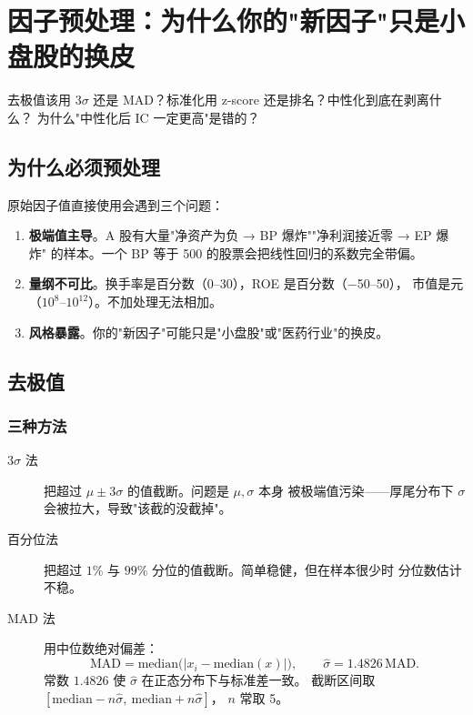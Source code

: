 \chapter{因子预处理：为什么你的"新因子"只是小盘股的换皮}\label{ch:prep}

\begin{keybox}[本章要回答的问题]
去极值该用 3$\sigma$ 还是 MAD？标准化用 z-score 还是排名？中性化到底在剥离什么？
为什么"中性化后 IC 一定更高"是错的？
\end{keybox}

\section{为什么必须预处理}

原始因子值直接使用会遇到三个问题：

\begin{enumerate}
  \item \textbf{极端值主导}。A 股有大量"净资产为负 → BP 爆炸""净利润接近零 → EP 爆炸"
        的样本。一个 BP 等于 500 的股票会把线性回归的系数完全带偏。
  \item \textbf{量纲不可比}。换手率是百分数（0--30），ROE 是百分数（$-$50--50），
        市值是元（$10^8$--$10^{12}$）。不加处理无法相加。
  \item \textbf{风格暴露}。你的"新因子"可能只是"小盘股"或"医药行业"的换皮。
\end{enumerate}

\section{去极值}

\subsection{三种方法}

\begin{description}
  \item[3$\sigma$ 法] 把超过 $\mu \pm 3\sigma$ 的值截断。问题是 $\mu,\sigma$ 本身
        被极端值污染——厚尾分布下 $\sigma$ 会被拉大，导致"该截的没截掉"。
  \item[百分位法] 把超过 $1\%$ 与 $99\%$ 分位的值截断。简单稳健，但在样本很少时
        分位数估计不稳。
  \item[MAD 法] 用中位数绝对偏差：
        \begin{equation}
          \text{MAD} = \mathrm{median}\big(|x_i - \mathrm{median}(x)|\big), \qquad
          \hat\sigma = 1.4826\,\text{MAD}.
        \end{equation}
        常数 $1.4826$ 使 $\hat\sigma$ 在正态分布下与标准差一致。
        截断区间取 $[\mathrm{median} - n\hat\sigma,\ \mathrm{median} + n\hat\sigma]$，
        $n$ 常取 5。
\end{description}


